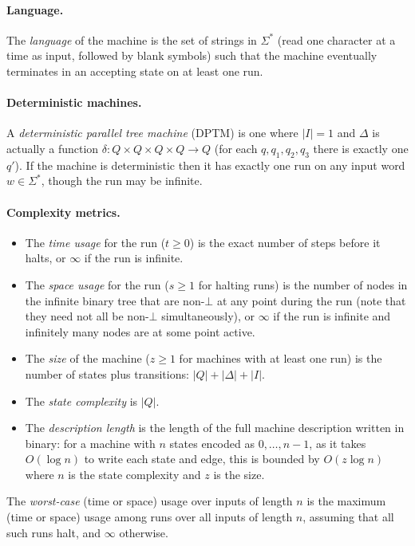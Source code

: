 \documentclass{article}
\begin{document}
\paragraph*{Language.}
The \emph{language} of the machine is the set of strings in $\Sigma^*$ (read one character at a time as input, followed by blank symbols)
such that the machine eventually terminates in an accepting state on at least one run.

\paragraph*{Deterministic machines.}
A \emph{deterministic parallel tree machine} (DPTM) is one where $|I| = 1$ and $\Delta$ is actually a function $\delta: Q \times Q \times Q \times Q \to Q$ (for each $q, q_1, q_2, q_3$ there is exactly one $q'$).
If the machine is deterministic then it has exactly one run on any input word $w \in \Sigma^*$, though the run may be infinite.

\paragraph*{Complexity metrics.}
\begin{itemize}
\item The \emph{time usage} for the run ($t \ge 0$) is the exact number of steps before it halts, or $\infty$ if the run is infinite.
\item The \emph{space usage} for the run ($s \ge 1$ for halting runs) is the number of nodes in the infinite binary tree that are non-$\bot$ at any point during the run (note that they need not all be non-$\bot$ simultaneously),
or $\infty$ if the run is infinite and infinitely many nodes are at some point active.
\item The \emph{size} of the machine ($z \ge 1$ for machines with at least one run) is the number of states plus transitions: $|Q| + |\Delta| + |I|$.
\item The \emph{state complexity} is $|Q|$.
\item The \emph{description length} is the length of the full machine description written in binary: for a machine with $n$ states encoded as $0, \ldots, n - 1$, as it takes $O(\log n)$ to write each state and edge, this is bounded by $O(z \log n)$ where $n$ is the state complexity and $z$ is the size.
\end{itemize}

The \emph{worst-case} (time or space) usage over inputs of length $n$ is the maximum (time or space) usage among runs over all inputs of length $n$, assuming that all such runs halt, and $\infty$ otherwise.
\end{document}
